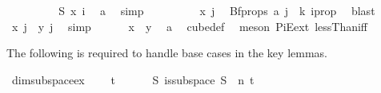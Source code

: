 \begin{isabellebody}
\ \ \ \isamarkupfalse%
\ \isamarkupfalse%
\ {\isachardoublequoteopen}\ {\isachardot}{\kern0pt}{\isachardot}{\kern0pt}{\isachardot}{\kern0pt}\ {\isacharequal}{\kern0pt}\ S\ x\ i{\isachardoublequoteclose}\ \isamarkupfalse%
\ a\ \isamarkupfalse%
\ simp\isanewline
\ \ \ \isamarkupfalse%
\ \isamarkupfalse%
\ {\isachardoublequoteopen}\ {\isachardot}{\kern0pt}{\isachardot}{\kern0pt}{\isachardot}{\kern0pt}\ {\isacharequal}{\kern0pt}\ x\ j{\isachardoublequoteclose}\ \isamarkupfalse%
\ Bf{\isacharunderscore}{\kern0pt}props\ a{\isacharparenleft}{\kern0pt}{}{\isacharparenright}{\kern0pt}\ {\isacartoucheopen}j\ {\isacharless}{\kern0pt}\ k{\isacartoucheclose}\ i{\isacharunderscore}{\kern0pt}prop\ \isamarkupfalse%
\ blast\isanewline
\ \ \ \isamarkupfalse%
\ \isamarkupfalse%
\ {\isachardoublequoteopen}x\ j\ {\isacharequal}{\kern0pt}\ y\ j{\isachardoublequoteclose}\ \isamarkupfalse%
\ simp\isanewline
\ \isamarkupfalse%
\isanewline
\ \isamarkupfalse%
\ \isamarkupfalse%
\ {\isachardoublequoteopen}x\ {\isacharequal}{\kern0pt}\ y{\isachardoublequoteclose}\ \isamarkupfalse%
\ a{\isacharparenleft}{\kern0pt}{}{\isacharcomma}{\kern0pt}{}{\isacharparenright}{\kern0pt}\ \isamarkupfalse%
\ cube{\isacharunderscore}{\kern0pt}def\ \isamarkupfalse%
\ {\isacharparenleft}{\kern0pt}meson\ PiE{\isacharunderscore}{\kern0pt}ext\ lessThan{\isacharunderscore}{\kern0pt}iff{\isacharparenright}{\kern0pt}\isanewline
{}\isamarkupfalse%
%
\endisatagproof
{\isafoldproof}%
%
\isadelimproof
%
\endisadelimproof
%
\begin{isamarkuptext}%
The following is required to handle base cases in the key lemmas.%
\end{isamarkuptext}\isamarkuptrue%
\isamarkupfalse%
\ dim{}{\isacharunderscore}{\kern0pt}subspace{\isacharunderscore}{\kern0pt}ex{\isacharcolon}{\kern0pt}\ \isanewline
\ \ \ {\isachardoublequoteopen}t\ {\isachargreater}{\kern0pt}\ {}{\isachardoublequoteclose}\ \isanewline
\ \ \ {\isachardoublequoteopen}{\isasymexists}S{\isachardot}{\kern0pt}\ is{\isacharunderscore}{\kern0pt}subspace\ S\ {}\ n\ t{\isachardoublequoteclose}\isanewline
%
\isadelimproof
%
\endisadelimproof
%
\isatagproof
{}\isamarkupfalse%

\end{isabellebody}
